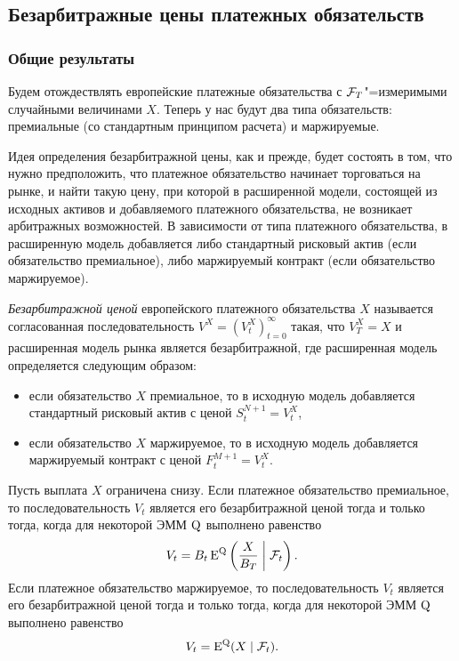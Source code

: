 \subsection{Безарбитражные цены платежных обязательств}

\subsubsection{Общие результаты}
Будем отождествлять европейские платежные обязательства с $\mathcal{F}_T$"=измеримыми случайными величинами $X$.
Теперь у нас будут два типа обязательств: премиальные (со стандартным принципом расчета) и маржируемые. 

Идея определения безарбитражной цены, как и прежде, будет состоять в том, что нужно предположить, что платежное обязательство начинает торговаться на рынке, и найти такую цену, при которой в расширенной модели, состоящей из исходных активов и добавляемого платежного обязательства, не возникает арбитражных возможностей.
В зависимости от типа платежного обязательства, в расширенную модель добавляется либо стандартный рисковый актив (если обязательство премиальное), либо маржируемый контракт (если обязательство маржируемое).

\begin{definition}
\emph{Безарбитражной ценой} европейского платежного обязательства $X$ называется согласованная последовательность $V^X = (V_t^X)_{t=0}^\infty$ такая, что $V_T^X = X$ и расширенная модель рынка является безарбитражной, где расширенная модель определяется следующим образом:
\begin{itemize}
\item если обязательство $X$ премиальное, то в исходную модель добавляется стандартный рисковый актив с ценой $S_t^{N+1} = V_t^X$,
\item если обязательство $X$ маржируемое, то в исходную модель добавляется маржируемый контракт с ценой $F_t^{M+1} = V_t^X$.
\end{itemize}
\end{definition}

\begin{theorem}
\label{fut:t:pricing}
Пусть выплата $X$ ограничена снизу.
Если платежное обязательство премиальное, то последовательность $V_t$ является его безарбитражной ценой тогда и только тогда, когда для некоторой ЭММ $\mathrm{Q}$ выполнено равенство
\[
V_t = B_t \operatorname{E}^{\mathrm{Q}}\left(\frac{X}{B_T}\;\bigg|\; \mathcal{F}_t\right).
\]
Если платежное обязательство маржируемое, то последовательность $V_t$ является его безарбитражной ценой тогда и только тогда, когда для некоторой ЭММ $\mathrm{Q}$ выполнено равенство
\[
V_t = \operatorname{E}^{\mathrm{Q}}(X\mid \mathcal{F}_t).
\]
\end{theorem}

